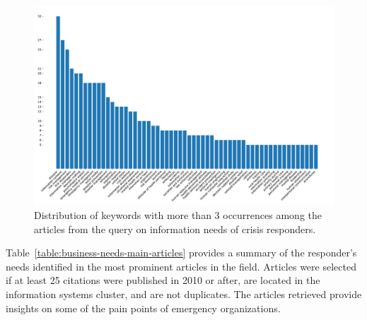 \begin{figure}[thb]
    \centering
    \includegraphics[width=\textwidth]{figures/chap-2/business-needs-bar.pdf}
    \caption{Distribution of keywords with more than 3 occurrences among the articles from the query on information needs of crisis responders.}
    \label{literature:business-needs-bar}
\end{figure}

Table~\ref{table:business-needs-main-articles} provides a summary of the responder's needs identified in the most prominent articles in the field.
Articles were selected if at least 25 citations were published in 2010 or after, are located in the information systems cluster, and are not duplicates.
The articles retrieved provide insights on some of the pain points of emergency organizations.

